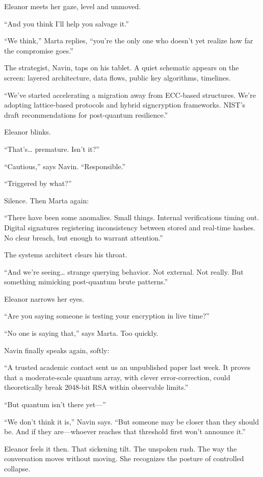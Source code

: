 Eleanor meets her gaze, level and unmoved.

“And you think I’ll help you salvage it.”

“We think,” Marta replies, “you’re the only one who doesn’t yet realize how far the compromise goes.”

The strategist, Navin, taps on his tablet. A quiet schematic appears on the screen: layered architecture, data flows, public key algorithms, timelines.

“We’ve started accelerating a migration away from ECC-based structures. We’re adopting lattice-based protocols and hybrid signcryption frameworks. NIST’s draft recommendations for post-quantum resilience.”

Eleanor blinks.

“That’s… premature. Isn’t it?”

“Cautious,” says Navin. “Responsible.”

“Triggered by what?”

Silence. Then Marta again:

“There have been some anomalies. Small things. Internal verifications timing out. Digital signatures registering inconsistency between stored and real-time hashes. No clear breach, but enough to warrant attention.”

The systems architect clears his throat.

“And we’re seeing… strange querying behavior. Not external. Not really. But something mimicking post-quantum brute patterns.”

Eleanor narrows her eyes.

“Are you saying someone is testing your encryption in live time?”

“No one is saying that,” says Marta. Too quickly.

Navin finally speaks again, softly:

“A trusted academic contact sent us an unpublished paper last week. It proves that a moderate-scale quantum array, with clever error-correction, could theoretically break 2048-bit RSA within observable limits.”

“But quantum isn’t there yet—”

“We don’t think it is,” Navin says. “But someone may be closer than they should be. And if they are—whoever reaches that threshold first won’t announce it.”

Eleanor feels it then. That sickening tilt. The unspoken rush. The way the conversation moves without moving. She recognizes the posture of controlled collapse.


